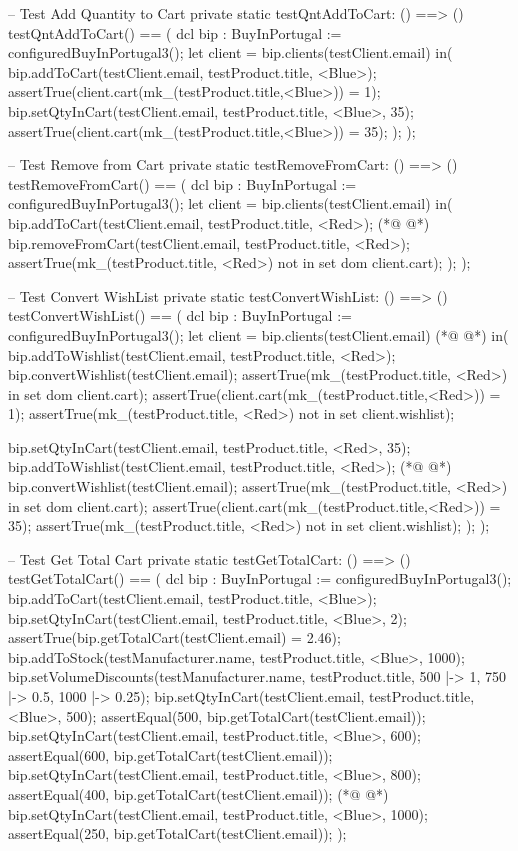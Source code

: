 \begin{vdmpp}[breaklines=true]
 -- Test Add Quantity to Cart
 private static testQntAddToCart: () ==> ()
 testQntAddToCart() == (
  dcl bip : BuyInPortugal := configuredBuyInPortugal3();
  let client = bip.clients(testClient.email)
  in(
   bip.addToCart(testClient.email, testProduct.title, <Blue>);
   assertTrue(client.cart(mk_(testProduct.title,<Blue>)) = 1);
   bip.setQtyInCart(testClient.email, testProduct.title, <Blue>, 35);
   assertTrue(client.cart(mk_(testProduct.title,<Blue>)) = 35);
  );
 );
 
 -- Test Remove from Cart
 private static testRemoveFromCart: () ==> ()
 testRemoveFromCart() == (
  dcl bip : BuyInPortugal := configuredBuyInPortugal3();
  let client = bip.clients(testClient.email)
  in(
   bip.addToCart(testClient.email, testProduct.title, <Red>);
(*@
\label{testGetTotalCart:346}
@*)
   bip.removeFromCart(testClient.email, testProduct.title, <Red>);
   assertTrue(mk_(testProduct.title, <Red>) not in set dom client.cart);
  );
 );
 
 -- Test Convert WishList
 private static testConvertWishList: () ==> ()
 testConvertWishList() == (
  dcl bip : BuyInPortugal := configuredBuyInPortugal3();
  let client = bip.clients(testClient.email)
(*@
\label{testAll:356}
@*)
  in(
   bip.addToWishlist(testClient.email, testProduct.title, <Red>);
    bip.convertWishlist(testClient.email);
    assertTrue(mk_(testProduct.title, <Red>) in set dom client.cart);
    assertTrue(client.cart(mk_(testProduct.title,<Red>)) = 1);
    assertTrue(mk_(testProduct.title, <Red>) not in set client.wishlist);
    
   bip.setQtyInCart(testClient.email, testProduct.title, <Red>, 35);
   bip.addToWishlist(testClient.email, testProduct.title, <Red>);
(*@
\label{testRemoveProduct:365}
@*)
    bip.convertWishlist(testClient.email);
    assertTrue(mk_(testProduct.title, <Red>) in set dom client.cart);
    assertTrue(client.cart(mk_(testProduct.title,<Red>)) = 35);
    assertTrue(mk_(testProduct.title, <Red>) not in set client.wishlist);
  );
 );
 
 -- Test Get Total Cart
 private static testGetTotalCart: () ==> ()
 testGetTotalCart() == (
  dcl bip : BuyInPortugal := configuredBuyInPortugal3();
  bip.addToCart(testClient.email, testProduct.title, <Blue>);
  bip.setQtyInCart(testClient.email, testProduct.title, <Blue>, 2);
  assertTrue(bip.getTotalCart(testClient.email) = 2.46);
  bip.addToStock(testManufacturer.name, testProduct.title, <Blue>, 1000);
  bip.setVolumeDiscounts(testManufacturer.name, testProduct.title, { 500 |-> 1, 750 |-> 0.5, 1000 |-> 0.25});
  bip.setQtyInCart(testClient.email, testProduct.title, <Blue>, 500);
  assertEqual(500, bip.getTotalCart(testClient.email));
  bip.setQtyInCart(testClient.email, testProduct.title, <Blue>, 600);
  assertEqual(600, bip.getTotalCart(testClient.email));
  bip.setQtyInCart(testClient.email, testProduct.title, <Blue>, 800);
  assertEqual(400, bip.getTotalCart(testClient.email));
(*@
\label{testBuy:387}
@*)
  bip.setQtyInCart(testClient.email, testProduct.title, <Blue>, 1000);
  assertEqual(250, bip.getTotalCart(testClient.email));
 );
 

\end{vdmpp}
